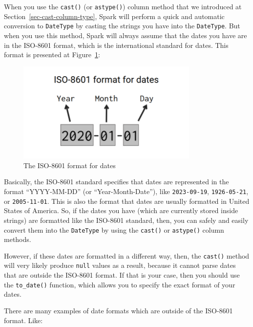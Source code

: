 \documentclass[
  11pt,
  letterpaper,
  DIV=11,
  numbers=noendperiod]{scrreprt}
\begin{document}
When you use the \texttt{cast()} (or \texttt{astype()}) column method
that we introduced at Section~\ref{sec-cast-column-type}, Spark will
perform a quick and automatic conversion to \texttt{DateType} by casting
the strings you have into the \texttt{DateType}. But when you use this
method, Spark will always assume that the dates you have are in the
ISO-8601 format, which is the international standard for dates. This
format is presented at Figure~\ref{fig-iso-8601-dates}:

\begin{figure}

{\centering \includegraphics[width=0.8\textwidth,height=\textheight]{Chapters/./../Figures/format_date.png}

}

\caption{\label{fig-iso-8601-dates}The ISO-8601 format for dates}

\end{figure}

Basically, the ISO-8601 standard specifies that dates are represented in
the format ``YYYY-MM-DD'' (or ``Year-Month-Date''), like
\texttt{2023-09-19}, \texttt{1926-05-21}, or \texttt{2005-11-01}. This
is also the format that dates are usually formatted in United States of
America. So, if the dates you have (which are currently stored inside
strings) are formatted like the ISO-8601 standard, then, you can safely
and easily convert them into the \texttt{DateType} by using the
\texttt{cast()} or \texttt{astype()} column methods.

However, if these dates are formatted in a different way, then, the
\texttt{cast()} method will very likely produce \texttt{null} values as
a result, because it cannot parse dates that are outside the ISO-8601
format. If that is your case, then you should use the
\texttt{to\_date()} function, which allows you to specify the exact
format of your dates.

There are many examples of date formats which are outside of the
ISO-8601 format. Like:
\end{document}
